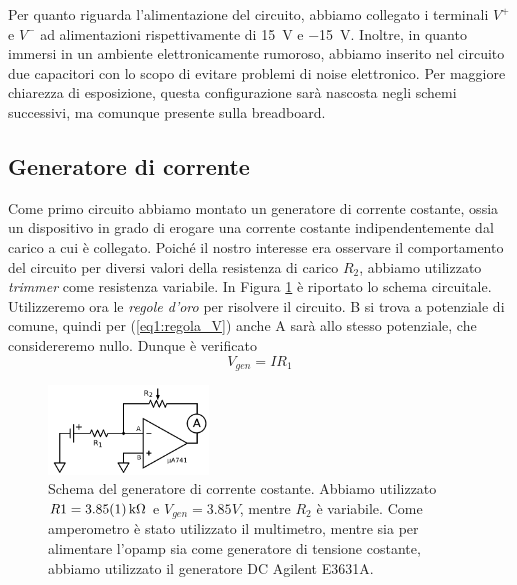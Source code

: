 Per quanto riguarda l'alimentazione del circuito, abbiamo collegato i terminali $V^+$ e $V^-$ ad alimentazioni rispettivamente di \SI{+15}{\volt} e \SI{-15}{\volt}. Inoltre, in quanto immersi in un ambiente elettronicamente rumoroso, abbiamo inserito nel circuito due capacitori con lo scopo di evitare problemi di noise elettronico.
Per maggiore chiarezza di esposizione, questa configurazione sarà nascosta negli schemi successivi, ma comunque presente sulla breadboard.

\subsection{Generatore di corrente}

Come primo circuito abbiamo montato un generatore di corrente costante, ossia un dispositivo in grado di erogare una corrente costante indipendentemente dal carico a cui è collegato.
Poiché il nostro interesse era osservare il comportamento del circuito per diversi valori della resistenza di carico $R_2$, abbiamo utilizzato \textit{trimmer} come resistenza variabile. In Figura \ref{cir1:gen_continua} è riportato lo schema circuitale.
Utilizzeremo ora le \textit{regole d'oro} per risolvere il circuito. B si trova a potenziale di comune, quindi per (\ref{eq1:regola_V}) anche A sarà allo stesso potenziale, che considereremo nullo. Dunque è verificato
\begin{equation}
V_{gen}=I R_1
\label{eq1:gen_1}
\end{equation}

\begin{figure}
  \caption{Schema del generatore di corrente costante. Abbiamo utilizzato $R1=\SI{3.85\pm0.01}{\kilo\ohm}$ e $V_{gen}=3.85 V$, mentre $R_2$ è variabile. Come amperometro è stato utilizzato il multimetro, mentre sia per alimentare l'opamp sia come generatore di tensione costante, abbiamo utilizzato il generatore DC Agilent E3631A.}
  \begin{center}
    \includegraphics[width=0.38\textwidth]{../E01/latex/c1.pdf}
  \end{center}
\label{cir1:gen_continua}
\end{figure}

